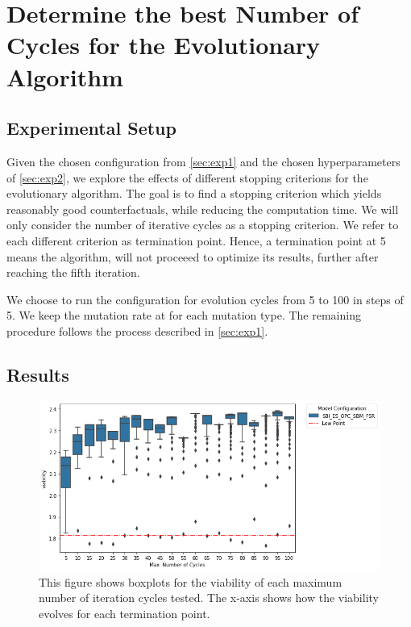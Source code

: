 \documentclass[./../../paper.tex]{subfiles}
\begin{document}
\section{Determine the best Number of Cycles for the Evolutionary Algorithm }

\subsection{Experimental Setup}
\label{sec:exp3}
Given the chosen configuration from \autoref{sec:exp1} and the chosen hyperparameters of \autoref{sec:exp2}, we explore the effects of different stopping criterions for the evolutionary algorithm. The goal is to find a stopping criterion which yields reasonably good counterfactuals, while reducing the computation time. We will only consider the number of iterative cycles as a stopping criterion. We refer to each different criterion as termination point. Hence, a termination point at 5 means the algorithm, will not proceeed to optimize its results, further after reaching the fifth iteration.

We choose to run the configuration for evolution cycles from 5 to 100 in steps of 5. We keep the mutation rate at  for each mutation type. The remaining procedure follows the process described in \autoref{sec:exp1}.

\subsection{Results}
\begin{figure}[htbp]
    \centering
    \includegraphics[width=\textwidth]{figures/generated/exp3_cycles_spread.png}
    \caption{This figure shows boxplots for the viability of each maximum number of iteration cycles tested. The x-axis shows how the viability evolves for each termination point.}
    \label{fig:exp3-normalized-lineplot}
\end{figure}
\end{document}
